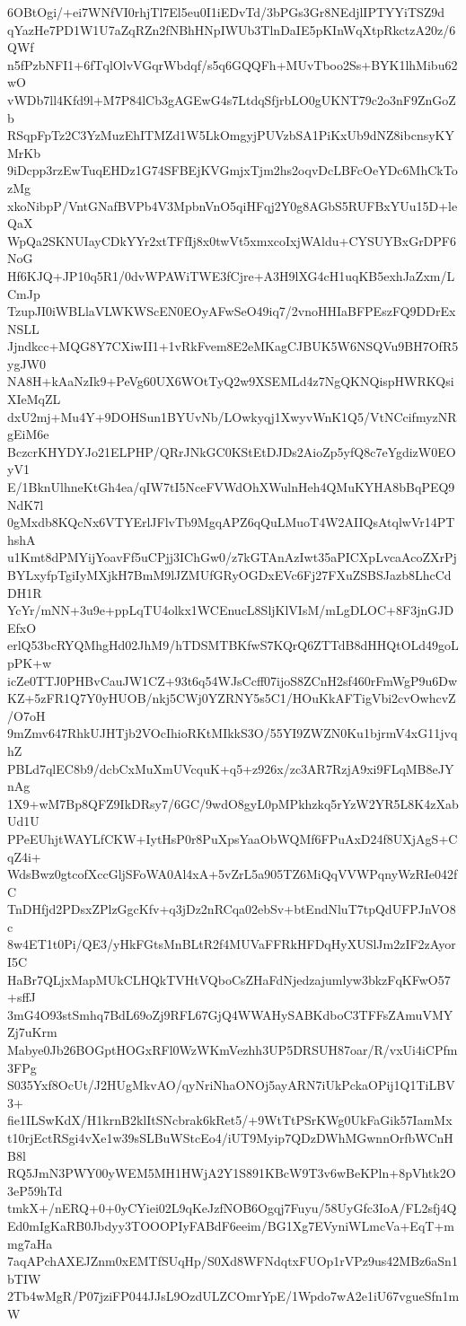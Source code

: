 6OBtOgi/+ei7WNfVI0rhjTl7El5eu0I1iEDvTd/3bPGs3Gr8NEdjlIPTYYiTSZ9d
qYazHe7PD1W1U7aZqRZn2fNBhHNpIWUb3TlnDaIE5pKInWqXtpRkctzA20z/6QWf
n5fPzbNFI1+6fTqlOlvVGqrWbdqf/s5q6GQQFh+MUvTboo2Ss+BYK1lhMibu62wO
vWDb7ll4Kfd9l+M7P84lCb3gAGEwG4s7LtdqSfjrbLO0gUKNT79c2o3nF9ZnGoZb
RSqpFpTz2C3YzMuzEhITMZd1W5LkOmgyjPUVzbSA1PiKxUb9dNZ8ibcnsyKYMrKb
9iDcpp3rzEwTuqEHDz1G74SFBEjKVGmjxTjm2hs2oqvDcLBFcOeYDc6MhCkTozMg
xkoNibpP/VntGNafBVPb4V3MpbnVnO5qiHFqj2Y0g8AGbS5RUFBxYUu15D+leQaX
WpQa2SKNUIayCDkYYr2xtTFfIj8x0twVt5xmxcoIxjWAldu+CYSUYBxGrDPF6NoG
Hf6KJQ+JP10q5R1/0dvWPAWiTWE3fCjre+A3H9lXG4cH1uqKB5exhJaZxm/LCmJp
TzupJI0iWBLlaVLWKWScEN0EOyAFwSeO49iq7/2vnoHHIaBFPEszFQ9DDrExNSLL
Jjndkcc+MQG8Y7CXiwII1+1vRkFvem8E2eMKagCJBUK5W6NSQVu9BH7OfR5ygJW0
NA8H+kAaNzIk9+PeVg60UX6WOtTyQ2w9XSEMLd4z7NgQKNQispHWRKQsiXIeMqZL
dxU2mj+Mu4Y+9DOHSun1BYUvNb/LOwkyqj1XwyvWnK1Q5/VtNCcifmyzNRgEiM6e
BczcrKHYDYJo21ELPHP/QRrJNkGC0KStEtDJDs2AioZp5yfQ8c7eYgdizW0EOyV1
E/1BknUlhneKtGh4ea/qIW7tI5NceFVWdOhXWulnHeh4QMuKYHA8bBqPEQ9NdK7l
0gMxdb8KQcNx6VTYErlJFlvTb9MgqAPZ6qQuLMuoT4W2AIIQsAtqlwVr14PThshA
u1Kmt8dPMYijYoavFf5uCPjj3IChGw0/z7kGTAnAzIwt35aPICXpLvcaAcoZXrPj
BYLxyfpTgiIyMXjkH7BmM9lJZMUfGRyOGDxEVc6Fj27FXuZSBSJazb8LhcCdDH1R
YcYr/mNN+3u9e+ppLqTU4olkx1WCEnucL8SljKlVIsM/mLgDLOC+8F3jnGJDEfxO
erlQ53bcRYQMhgHd02JhM9/hTDSMTBKfwS7KQrQ6ZTTdB8dHHQtOLd49goLpPK+w
icZe0TTJ0PHBvCauJW1CZ+93t6q54WJsCcff07ijoS8ZCnH2sf460rFmWgP9u6Dw
KZ+5zFR1Q7Y0yHUOB/nkj5CWj0YZRNY5s5C1/HOuKkAFTigVbi2cvOwhcvZ/O7oH
9mZmv647RhkUJHTjb2VOcIhioRKtMIkkS3O/55YI9ZWZN0Ku1bjrmV4xG11jvqhZ
PBLd7qlEC8b9/dcbCxMuXmUVcquK+q5+z926x/zc3AR7RzjA9xi9FLqMB8eJYnAg
1X9+wM7Bp8QFZ9IkDRsy7/6GC/9wdO8gyL0pMPkhzkq5rYzW2YR5L8K4zXabUd1U
PPeEUhjtWAYLfCKW+IytHsP0r8PuXpsYaaObWQMf6FPuAxD24f8UXjAgS+CqZ4i+
WdsBwz0gtcofXccGljSFoWA0Al4xA+5vZrL5a905TZ6MiQqVVWPqnyWzRIe042fC
TnDHfjd2PDsxZPlzGgcKfv+q3jDz2nRCqa02ebSv+btEndNluT7tpQdUFPJnVO8c
8w4ET1t0Pi/QE3/yHkFGtsMnBLtR2f4MUVaFFRkHFDqHyXUSlJm2zIF2zAyorI5C
HaBr7QLjxMapMUkCLHQkTVHtVQboCsZHaFdNjedzajumlyw3bkzFqKFwO57+sffJ
3mG4O93stSmhq7BdL69oZj9RFL67GjQ4WWAHySABKdboC3TFFsZAmuVMYZj7uKrm
Mabye0Jb26BOGptHOGxRFl0WzWKmVezhh3UP5DRSUH87oar/R/vxUi4iCPfm3FPg
S035Yxf8OcUt/J2HUgMkvAO/qyNriNhaONOj5ayARN7iUkPckaOPij1Q1TiLBV3+
fie1ILSwKdX/H1krnB2klItSNcbrak6kRet5/+9WtTtPSrKWg0UkFaGik57IamMx
t10rjEctRSgi4vXe1w39sSLBuWStcEo4/iUT9Myip7QDzDWhMGwnnOrfbWCnHB8l
RQ5JmN3PWY00yWEM5MH1HWjA2Y1S891KBcW9T3v6wBeKPln+8pVhtk2O3eP59hTd
tmkX+/nERQ+0+0yCYiei02L9qKeJzfNOB6Ogqj7Fuyu/58UyGfc3IoA/FL2sfj4Q
Ed0mIgKaRB0Jbdyy3TOOOPIyFABdF6eeim/BG1Xg7EVyniWLmcVa+EqT+mmg7aHa
7aqAPchAXEJZnm0xEMTfSUqHp/S0Xd8WFNdqtxFUOp1rVPz9us42MBz6aSn1bTIW
2Tb4wMgR/P07jziFP044JJsL9OzdULZCOmrYpE/1Wpdo7wA2e1iU67vgueSfn1mW
